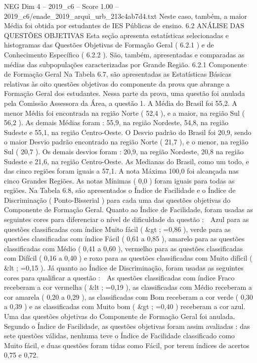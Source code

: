 \begin{textsample}{NEG Dim 4 – 2019\_c6 – Score 1.00 – 2019\_c6/enade\_2019\_arqui\_urb\_213c4ab7d4.txt}
Neste caso, também, a maior Média foi obtida por estudantes de IES Públicas de ensino. 6.2 ANÁLISE DAS QUESTÕES OBJETIVAS Esta seção apresenta estatísticas selecionadas e histogramas das Questões Objetivas de Formação Geral ( 6.2.1 ) e de Conhecimento Específico ( 6.2.2 ).
São, também, apresentadas e comparadas as médias das subpopulações caracterizadas por Grande Região. 6.2.1 Componente de Formação Geral Na Tabela 6.7, são apresentadas as Estatísticas Básicas relativas às oito questões objetivas do componente da prova que abrange a Formação Geral dos estudantes.
Nessa parte da prova, uma questão foi anulada pela Comissão Assessora da Área, a questão 1.
A Média do Brasil foi 55,2.
A menor Média foi encontrada na região Norte ( 52,4 ), e a maior, na região Sul ( 56,2 ).
As demais Médias foram : 55,9, na região Nordeste, 54,8, na região Sudeste e 55,1, na região Centro-Oeste.
O Desvio padrão do Brasil foi 20,9, sendo o maior Desvio padrão encontrado na região Norte ( 21,7 ), e o menor, na região Sul ( 20,7 ).
Os demais desvios foram : 20,9, na região Nordeste, 20,8 na região Sudeste e 21,6, na região Centro-Oeste.
As Medianas do Brasil, como um todo, e das cinco regiões foram iguais a 57,1.
A nota Máxima 100,0 foi alcançada nas cinco Grandes Regiões.
As notas Mínimas ( 0,0 ) foram iguais para todas as regiões.
Na Tabela 6.8, são apresentados o Índice de Facilidade e o Índice de Discriminação ( Ponto-Bisserial ) para cada uma das questões objetivas do Componente de Formação Geral.
Quanto ao Índice de Facilidade, foram usadas as seguintes cores para diferenciar o nível de dificuldade da questão :  Azul para as questões classificadas com índice Muito fácil ( \&gt ; =0,86 ), verde para as questões classificadas com índice Fácil ( 0,61 a 0,85 ), amarelo para as questões classificadas com Médio ( 0,41 a 0,60 ), vermelho para as questões classificadas com Difícil ( 0,16 a 0,40 ) e roxo para as questões classificadas com Muito difícil ( \&lt ; =0,15 ).
Já quanto ao Índice de Discriminação, foram usadas as seguintes cores para qualificar a questão :  As questões classificadas com índice Fraco receberam a cor vermelha ( \&lt ; =0,19 ), as classificadas com Médio receberam a cor amarela ( 0,20 a 0,29 ), as classificadas com Bom receberam a cor verde ( 0,30 a 0,39 ) e as classificadas com Muito bom ( \&gt ; =0,40 ) receberam a cor azul.
Uma das questões objetivas do Componente de Formação Geral foi anulada.
Segundo o Índice de Facilidade, as questões objetivas foram assim avaliadas : das sete questões válidas, nenhuma teve o Índice de Facilidade classificado como Muito fácil, e duas questões foram tidas como Fácil, por terem índices de acertos 0,75 e 0,72.

\end{textsample}
